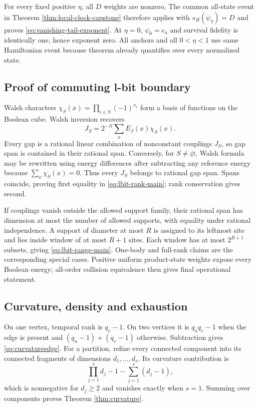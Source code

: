 For every fixed positive $\eta$, all $D$ weights are nonzero.  The common
all-state event in Theorem \ref{thm:local-clock-capstone} therefore applies
with $s_H(\psi_\eta)=D$ and proves
\eqref{eq:vanishing-tail-exponent}.  At $\eta=0$, $\psi_0=e_a$ and survival
fidelity is identically one, hence exponent zero.  All anchors and all
$0<\eta<1$ use same Hamiltonian event because theorem already quantifies over
every normalized state.

\subsection{Proof of commuting l-bit boundary}

Walsh characters
$\chi_S(x)=\prod_{i\in S}(-1)^{x_i}$ form a basis of functions on the Boolean cube.
Walsh inversion recovers
\[
 J_S=2^{-N}\sum_x E_J(x)\chi_S(x).
\]
Every gap is a rational linear combination of nonconstant couplings
$J_S$, so gap span is contained in their rational span.  Conversely, for
$S\ne\varnothing$, Walsh formula may be rewritten using energy differences
after subtracting any reference energy because
$\sum_x\chi_S(x)=0$.  Thus every $J_S$ belongs to rational gap span.  Spans
coincide, proving first equality in \eqref{eq:lbit-rank-main}; rank
conservation gives second.

If couplings vanish outside the allowed support family, their rational span has
dimension at most the number of allowed supports, with equality under rational
independence.  A support of diameter at most $R$ is assigned to its leftmost
site and lies inside window of at most $R+1$ sites.  Each window has at most
$2^{R+1}$ subsets, giving \eqref{eq:lbit-range-main}.  One-body and full-rank
claims are the corresponding special cases.  Positive uniform product-state
weights expose every Boolean energy; all-order collision equivalence then
gives final operational statement.

\subsection{Curvature, density and exhaustion}

On one vertex, temporal rank is $q_v-1$.  On two vertices it is
$q_uq_v-1$ when the edge is present and
$(q_u-1)+(q_v-1)$ otherwise.  Subtraction gives
\eqref{eq:curvatureedge}.  For a partition, refine every connected component
into its connected fragments of dimensions $d_1,\ldots,d_s$.  Its curvature
contribution is
\[
 \prod_{j=1}^s d_j-1-\sum_{j=1}^s(d_j-1),
\]
which is nonnegative for $d_j\ge2$ and vanishes exactly when $s=1$.  Summing
over components proves Theorem \ref{thm:curvature}.

